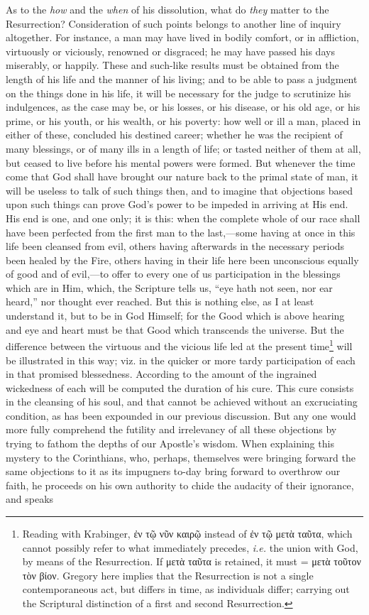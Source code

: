 As to the \emph{how} and the \emph{when} of his dissolution, what do \emph{they} matter to the Resurrection? Consideration of such points belongs to another line of inquiry altogether. For instance, a man may have lived in bodily comfort, or in affliction, virtuously or viciously, renowned or disgraced; he may have passed his days miserably, or happily. These and such-like results must be obtained from the length of his life and the manner of his living; and to be able to pass a judgment on the things done in his life, it will be necessary for the judge to scrutinize his indulgences, as the case may be, or his losses, or his disease, or his old age, or his prime, or his youth, or his wealth, or his poverty: how well or ill a man, placed in either of these, concluded his destined career; whether he was the recipient of many blessings, or of many ills in a length of life; or tasted neither of them at all, but ceased to live before his mental powers were formed. But whenever the time come that God shall have brought our nature back to the primal state of man, it will be useless to talk of such things then, and to imagine that objections based upon such things can prove God’s power to be impeded in arriving at His end. His end is one, and one only; it is this: when the complete whole of our race shall have been perfected from the first man to the last,—some having at once in this life been cleansed from evil, others having afterwards in the necessary periods been healed by the Fire, others having in their life here been unconscious equally of good and of evil,—to offer to every one of us participation in the blessings which are in Him, which, the Scripture tells us, “eye hath not seen, nor ear heard,” nor thought ever reached. But this is nothing else, as I at least understand it, but to be in God Himself; for the Good which is above hearing and eye and heart must be that Good which transcends the universe. But the difference between the virtuous and the vicious life led at the present time\footnote{Reading with Krabinger, \textgreek{ἐν τῷ νῦν καιρῷ} instead of \textgreek{ἐν τῷ μετὰ ταῦτα}, which cannot possibly refer to what immediately precedes, \emph{i.e.} the union with God, by means of the Resurrection. If \textgreek{μετὰ ταῦτα} is retained, it must = \textgreek{μετὰ τοῦτον τὸν βίον}. Gregory here implies that the Resurrection is not a single contemporaneous act, but differs in time, as individuals differ; carrying out the Scriptural distinction of a first and second Resurrection.} will be illustrated in this way; viz. in the quicker or more tardy participation of each in that promised blessedness. According to the amount of the ingrained wickedness of each will be computed the duration of his cure. This cure consists in the cleansing of his soul, and that cannot be achieved without an excruciating condition, as has been expounded in our previous discussion. But any one would more fully comprehend the futility and irrelevancy of all these objections by trying to fathom the depths of our Apostle’s wisdom. When explaining this mystery to the Corinthians, who, perhaps, themselves were bringing forward the same objections to it as its impugners to-day bring forward to overthrow our faith, he proceeds on his own authority to chide the audacity of their ignorance, and speaks 